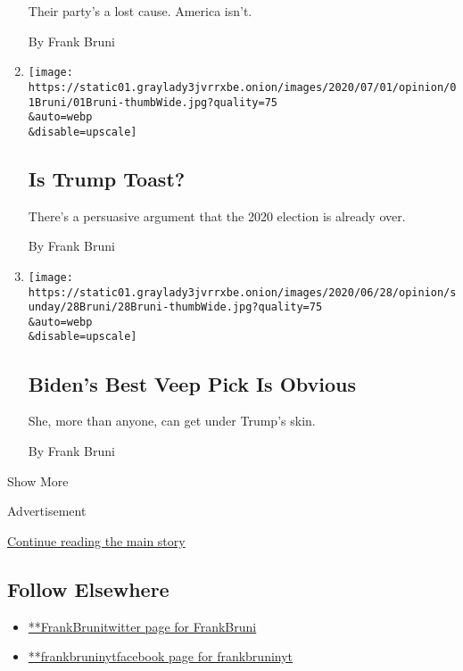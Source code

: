 \begin{enumerate}
  Their party's a lost cause. America isn't.

  By Frank Bruni
\item
  \href{/2020/07/01/opinion/trump-lose-2020-election.html}{}

  \texttt{[image: https://static01.graylady3jvrrxbe.onion/images/2020/07/01/opinion/01Bruni/01Bruni-thumbWide.jpg?quality=75\\\&auto=webp\\\&disable=upscale]}

  \hypertarget{is-trump-toast}{%
  \subsection{Is Trump Toast?}\label{is-trump-toast}}

  There's a persuasive argument that the 2020 election is already over.

  By Frank Bruni
\item
  \href{/2020/06/27/opinion/sunday/tammy-duckworth-biden-2020.html}{}

  \texttt{[image: https://static01.graylady3jvrrxbe.onion/images/2020/06/28/opinion/sunday/28Bruni/28Bruni-thumbWide.jpg?quality=75\\\&auto=webp\\\&disable=upscale]}

  \hypertarget{bidens-best-veep-pick-is-obvious}{%
  \subsection{Biden's Best Veep Pick Is
  Obvious}\label{bidens-best-veep-pick-is-obvious}}

  She, more than anyone, can get under Trump's skin.

  By Frank Bruni
\end{enumerate}

Show More

Advertisement

\protect\hyperlink{after-mid2}{Continue reading the main story}

\hypertarget{follow-elsewhere}{%
\subsection{Follow Elsewhere}\label{follow-elsewhere}}

\begin{itemize}
\tightlist
\item
  \href{https://twitter.com/FrankBruni}{**FrankBrunitwitter page for
  FrankBruni}
\item
  \href{https://www.facebookcorewwwi.onion/frankbruninyt}{**frankbruninytfacebook
  page for frankbruninyt}
\end{itemize}

